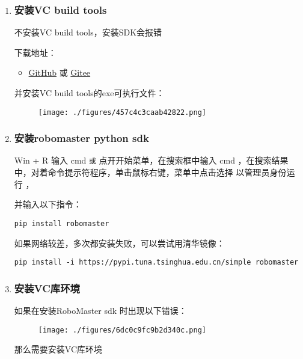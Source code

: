 \begin{enumerate}
\item \subsubsection{安装VC build tools}
不安装VC build tools，安装SDK会报错

下载地址：\begin{itemize}
\item \href{https://github.com/dji-sdk/robomaster-sdk}{GitHub} 或 \href{https://gitee.com/xitinglin/RoboMaster-SDK}{Gitee}
\end{itemize}

并安装VC build tools的exe可执行文件：

\begin{figure}[ht]
\centering
\texttt{[image: ./figures/457c4c3caab42822.png]}
\caption{} \label{fig_PyRM1_1}
\end{figure}

\item \subsubsection{安装robomaster python sdk}
Win + R 输入 cmd 
\verb|或|
点开开始菜单，在搜索框中输入 cmd ，在搜索结果中，对着命令提示符程序，单击鼠标右键，菜单中点击选择 以管理员身份运行 ，

并输入以下指令：

\begin{lstlisting}[language=pythonC]
pip install robomaster
\end{lstlisting}

如果网络较差，多次都安装失败，可以尝试用清华镜像：

\begin{lstlisting}[language=pythonC]
pip install -i https://pypi.tuna.tsinghua.edu.cn/simple robomaster
\end{lstlisting}

\item \subsubsection{安装VC库环境}
如果在安装RoboMaster sdk 时出现以下错误：
\begin{figure}[ht]
\centering
\texttt{[image: ./figures/6dc0c9fc9b2d340c.png]}
\caption{} \label{fig_PyRM1_2}
\end{figure}
那么需要安装VC库环境


\end{enumerate}
